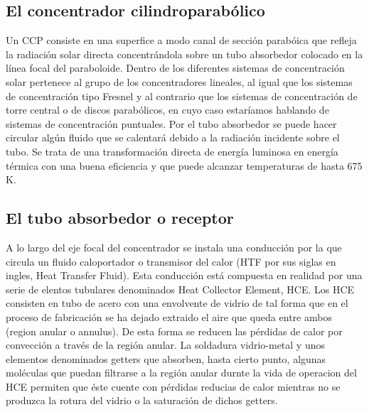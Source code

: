 \subsection{El concentrador cilindroparabólico}
\label{concentrador}
Un CCP consiste en una superfice a modo canal  de sección parabóica que refleja la radiación solar directa concentrándola sobre un tubo absorbedor colocado en la línea focal del paraboloide. Dentro de los diferentes sistemas de concentración solar pertenece al grupo de los concentradores lineales, al igual que los sistemas de concentración tipo Fresnel y al contrario que los sistemas de concentración de torre central o de discos parabólicos, en cuyo caso estaríamos hablando de sistemas de concentración puntuales. Por el tubo absorbedor se puede hacer circular algún fluido que se calentará debido a la radiación incidente sobre el tubo.  Se trata de una transformación directa de energía luminosa en energía térmica con una buena eficiencia y que puede alcanzar temperaturas de hasta 675 K. 

\subsection{El tubo absorbedor o receptor}
\label{tuboabsorbedor}
A lo largo del eje focal del concentrador se instala una conducción por la que circula un fluido caloportador o transmisor del calor (HTF por sus siglas en ingles, Heat Transfer Fluid). Esta conducción está compuesta en realidad por una serie de elentos tubulares denominados Heat Collector Element, HCE. Los HCE consisten en tubo de acero con una envolvente de vidrio de tal forma que en el proceso de fabricación se ha dejado extraido el aire que queda entre ambos (region anular o annulus). De esta forma se reducen las pérdidas de calor por convección a través de la región anular. La soldadura vidrio-metal y unos elementos denominados getters que absorben, hasta cierto punto, algunas moléculas que puedan filtrarse a la región anular durnte la vida de operacion del HCE permiten que éste cuente con pérdidas reducias de calor mientras no se produzca la rotura del vidrio o la saturación de dichos getters. 

